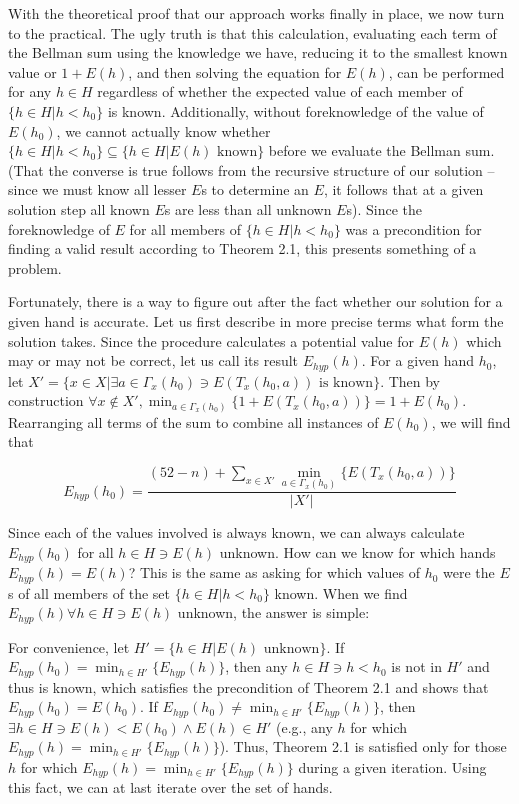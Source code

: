 \documentclass[letter,12pt]{article}
\begin{document}
With the theoretical proof that our approach works finally in place, we now turn to the practical. The ugly truth is that this calculation, evaluating each term of the Bellman sum using the knowledge we have, reducing it to the smallest known value or $1+E(h)$, and then solving the equation for $E(h)$, can be performed for any $h \in H$ regardless of whether the expected value of each member of $\{h \in H | h < h_0\}$ is known. Additionally, without foreknowledge of the value of $E(h_0)$, we cannot actually know whether $\{h \in H |h < h_0\} \subseteq \{h \in H | E(h) \textrm{ known}\}$ before we evaluate the Bellman sum. (That the converse is true follows from the recursive structure of our solution – since we must know all lesser $E$s to determine an $E$, it follows that at a given solution step all known $E$s are less than all unknown $E$s). Since the foreknowledge of $E$ for all members of $\{h \in H | h < h_0\}$ was a precondition for finding a valid result according to Theorem 2.1, this presents something of a problem. 

Fortunately, there is a way to figure out after the fact whether our solution for a given hand is accurate. Let us first describe in more precise terms what form the solution takes. Since the procedure calculates a potential value for $E(h)$ which may or may not be correct, let us call its result $E_{hyp}(h)$. For a given hand $h_0$, let $X' = \{x \in X | \exists a \in \Gamma_x(h_0) \ni E(T_x(h_0,a)) \textrm{ is known}\}$. Then by construction $\forall x \notin X', \min_{a \in \Gamma_x(h_0)}\{1+E(T_x(h_0,a))\}=1+E(h_0)$. Rearranging all terms of the sum to combine all instances of $E(h_0)$, we will find that 

$$E_{hyp}(h_0) = \frac{(52-n)+\sum_{x\in X'}\min_{a \in \Gamma_x(h_0)}\{E(T_x(h_0,a))\}}{|X'|}$$

Since each of the values involved is always known, we can always calculate $E_{hyp}(h_0)$ for all $h \in H \ni E(h)$ unknown. How can we know for which hands $E_{hyp}(h) = E(h)$? This is the same as asking for which values of $h_0$ were the $E$s of all members of the set $\{h \in H | h < h_0\}$ known. When we find $E_{hyp}(h) \forall h \in H \ni E(h)$ unknown, the answer is simple:

For convenience, let $H' = \{h \in H | E(h) \textrm{ unknown}\}$. If $E_{hyp}(h_0) = \min_{h \in H'}\{E_{hyp}(h)\}$, then any $h \in H \ni h < h_0$ is not in $H'$ and thus is known, which satisfies the precondition of Theorem 2.1 and shows that $E_{hyp}(h_0) = E(h_0)$. If $E_{hyp}(h_0) \ne \min_{h \in H'}\{E_{hyp}(h)\}$, then $\exists h \in H \ni E(h) < E(h_0) \wedge E(h) \in H'$ (e.g., any $h$ for which $E_{hyp}(h) = \min_{h \in H'}\{E_{hyp}(h)\}$). Thus, Theorem 2.1 is satisfied only for those $h$ for which $E_{hyp}(h) = \min_{h \in H'}\{E_{hyp}(h)\}$ during a given iteration. Using this fact, we can at last iterate over the set of hands.
\end{document}
